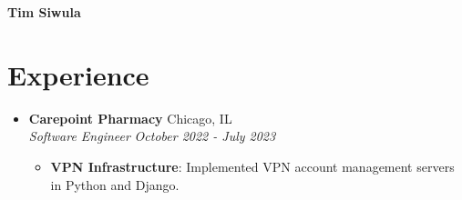 \documentclass{article}
\newcommand{\resumeItemListStart}{\begin{itemize}}
\newcommand{\resumeItemListEnd}{\end{itemize}\vspace{-5pt}}
\newcommand{\resumeSubheading}[4]{
  \item
  \textbf{#1} \hfill #2 \\
  \textit{#3} \hfill \textit{#4}
}
\newcommand{\resumeItem}[2]{
  \item\small{
    \textbf{#1}{: #2}
  }
}
\begin{document}

\begin{center}
\textbf{{\Large Tim Siwula}}
\end{center}

\section{Experience}
\begin{itemize}[leftmargin=*]

\resumeSubheading{Carepoint Pharmacy}{Chicago, IL}{Software Engineer}{October 2022 - July 2023}
\resumeItemListStart
\resumeItem{VPN Infrastructure}{Implemented VPN account management servers in Python and Django.}
\resumeItemListEnd


\end{itemize}

\end{document}

